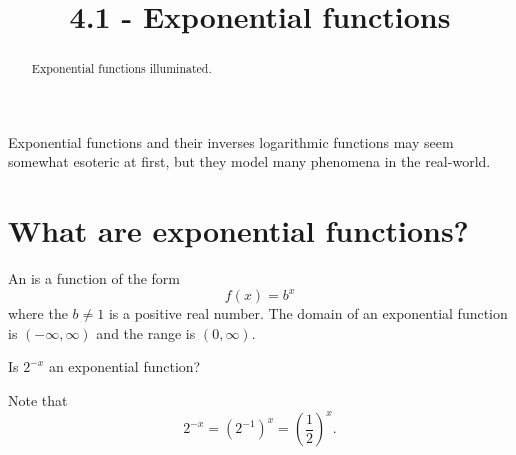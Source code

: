 \documentclass{ximera}
\title{4.1 - Exponential functions}
\begin{document}
\begin{abstract}
  Exponential functions illuminated.
\end{abstract}
\maketitle

Exponential functions and their inverses logarithmic functions may seem somewhat esoteric at
first, but they model many phenomena in the real-world.




\section{What are exponential functions?}


\begin{definition}
  An  is a function of the form
  \[
  f(x) = b^x
  \]
  where the  $b\ne 1$ is a positive real number. The domain of an
  exponential function is $(-\infty,\infty)$ and the range is $(0, \infty)$.
\end{definition}

\begin{question}
  Is $2^{-x}$ an exponential function?
  \begin{multipleChoice}
  \end{multipleChoice}
  \begin{feedback}
    Note that
    \[
    2^{-x} = \left(2^{-1}\right)^x = \left(\frac{1}{2}\right)^x.
    \]
  \end{feedback}
\end{question}


%
%
%
%   
\end{document}
